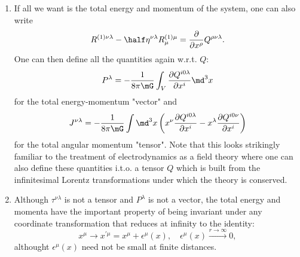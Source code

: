 \begin{enumerate}
	\item If all we want is the total energy and momentum of the system, one can also write
	\begin{equation}
		R^{(1)\nu \lambda} - \half \eta^{\nu \lambda} R^{(1)\mu}_\mu = \frac{\partial}{\partial x^\rho} Q^{\rho \nu \lambda}.
	\end{equation}
	One can then define all the quantities again w.r.t. $Q$:
	\begin{equation}
			P^\lambda =- \frac{1}{8 \pi \mG} \int_V \frac{\partial Q^{i 0 \lambda}}{\partial x^i} \md^3x
	\end{equation}
	for the total energy-momentum "vector" and 
	\begin{equation}
		J^{\nu \lambda} = -\frac{1}{8 \pi \mG} \int \md^3 x \left(x^\nu \frac{\partial Q^{i0\lambda}}{\partial x^i} - x^\lambda \frac{\partial Q^{i0\nu}}{\partial x^i}\right)
	\end{equation}
	for the total angular momentum "tensor". Note that this looks strikingly familiar to the treatment of electrodynamics as a field theory where one can also define these quantities i.t.o. a tensor $Q$ which is built from the infinitesimal Lorentz transformations under which the theory is conserved.
	\item Although $\tau^{\nu \lambda}$ is not a tensor and $P^\lambda$ is not a vector, the total energy and momenta have the important property of being invariant under any coordinate transformation that reduces at infinity to the identity:
	\begin{equation}
		x^\mu \rightarrow x^{\prime \mu} = x^\mu + \epsilon^\mu(x), \quad \epsilon^\mu(x) \stackrel{r\rightarrow\infty}{\longrightarrow} 0,
	\end{equation}
	althought $\epsilon^\mu(x)$ need not be small at finite distances.
\end{enumerate}


